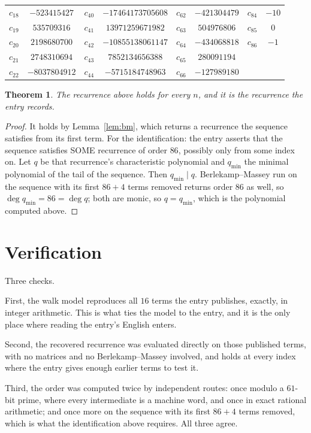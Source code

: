 \documentclass[11pt,a4paper]{article}
\theoremstyle{plain}
\newtheorem{theorem}{Theorem}
\theoremstyle{definition}
\begin{document}
\begin{center}
\begin{tabular}{cccccccc}
$c_{18}$ & $-523415427$ & $c_{40}$ & $-17464173705608$ & $c_{62}$ & $-421304479$ & $c_{84}$ & $-10$ \\
$c_{19}$ & $535709316$ & $c_{41}$ & $13971259671982$ & $c_{63}$ & $504976806$ & $c_{85}$ & $0$ \\
$c_{20}$ & $2198680700$ & $c_{42}$ & $-10855138061147$ & $c_{64}$ & $-434068818$ & $c_{86}$ & $-1$ \\
$c_{21}$ & $2748310694$ & $c_{43}$ & $7852134656388$ & $c_{65}$ & $280091194$ &  &  \\
$c_{22}$ & $-8037804912$ & $c_{44}$ & $-5715184748963$ & $c_{66}$ & $-127989180$ &  &  \\
\end{tabular}
\end{center}

\begin{theorem}
The recurrence above holds for every $n$, and it is the recurrence the entry records.
\end{theorem}

\begin{proof}
It holds by Lemma~\ref{lem:bm}, which returns a recurrence the sequence satisfies from its
first term. For the identification: the entry asserts that the sequence satisfies SOME
recurrence of order $86$, possibly only from some index on. Let $q$ be that recurrence's
characteristic polynomial and $q_{\min}$ the minimal polynomial of the tail of the sequence.
Then $q_{\min}\mid q$. Berlekamp--Massey run on the sequence with its first $86+4$ terms
removed returns order $86$ as well, so $\deg q_{\min}=86=\deg q$; both are monic, so
$q=q_{\min}$, which is the polynomial computed above.
\end{proof}

\section{Verification}

Three checks.

First, the walk model reproduces all $16$ terms the entry publishes, exactly, in integer
arithmetic. This is what ties the model to the entry, and it is the only place where reading
the entry's English enters.

Second, the recovered recurrence was evaluated directly on those published terms, with no
matrices and no Berlekamp--Massey involved, and holds at every index where the entry gives
enough earlier terms to test it.

Third, the order was computed twice by independent routes: once modulo a $61$-bit prime, where
every intermediate is a machine word, and once in exact rational arithmetic; and once more on
the sequence with its first $86+4$ terms removed, which is what the identification above
requires. All three agree.
\end{document}
